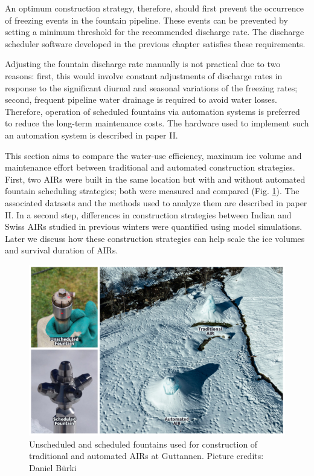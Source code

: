An optimum construction strategy, therefore, should first prevent the occurrence of freezing events in the
fountain pipeline. These events can be prevented by setting a minimum threshold for the recommended discharge
rate. The discharge scheduler software developed in the previous chapter satisfies these requirements.

Adjusting the fountain discharge rate manually is not practical due to two reasons: first, this would involve
constant adjustments of discharge rates in response to the significant diurnal and seasonal variations of the
freezing rates; second, frequent pipeline water drainage is required to avoid water losses. Therefore, operation
of scheduled fountains via automation systems is preferred to reduce the long-term maintenance costs. The
hardware used to implement such an automation system is described in paper II.

This section aims to compare the water-use efficiency, maximum ice volume and maintenance effort between
traditional and automated construction strategies. First, two AIRs were built in the same location but with and
without automated fountain scheduling strategies; both were measured and compared (Fig. \ref{fig:autovsman}).
The associated datasets and the methods used to analyze them are described in paper II. In a second step,
differences in construction strategies between Indian and Swiss AIRs studied in previous winters were quantified
using model simulations. Later we discuss how these construction strategies can help scale the ice volumes and
survival duration of AIRs. 

\begin{figure}[htb]
\includegraphics[width=\textwidth]{figs/AIR_fountains.jpg}
\caption{Unscheduled and scheduled fountains used for construction of traditional and automated AIRs at Guttannen. Picture credits: Daniel Bürki}
\label{fig:autovsman}
\end{figure}

